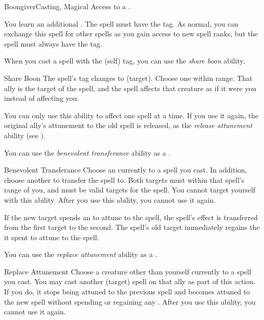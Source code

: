     \begin{feat}{Boongiver}{Casting, Magical}
        \featpre Access to a .

         You learn an additional .
        The spell must have the  tag.
        As normal, you can exchange this spell for other spells as you gain access to new spell ranks, but the spell must always have the  tag.

         When you cast a spell with the  (self) tag, you can use the \textit{share boon} ability.
        \begin{durationability}{Share Boon}
            The spell's  tag changes to  (target).
            Choose one  within \rngmed range.
            That ally is the target of the spell, and the spell affects that creature as if it were you instead of affecting you.

            You can only use this ability to affect one spell at a time.
            If you use it again, the original ally's attunement to the old spell is released, as the \textit{release attunement} ability (see ).
        \end{durationability}

         You can use the \textit{benevolent transferance} ability as a .
        \begin{instantability}{Benevolent Transferance}
            Choose an  currently  to a spell you cast.
            In addition, choose another  to transfer the spell to.
            Both targets must within that spell's range of you, and must be valid targets for the spell.
            You cannot target yourself with this ability.
            After you use this ability, you  cannot use it again.

            If the new target spends an  to attune to the spell, the spell's effect is transferred from the first target to the second.
            The spell's old target immediately regains the  it spent to attune to the spell.
        \end{instantability}

         You can use the \textit{replace attunement} ability as a .
        \begin{instantability}{Replace Attunement}
            Choose a creature other than yourself currently  to a spell you cast.
            You may cast another  (target) spell on that ally as part of this action.
            If you do, it stops being attuned to the previous spell and becomes attuned to the new spell without spending or regaining any .
            After you use this ability, you  cannot use it again.
        \end{instantability}


\end{feat}
